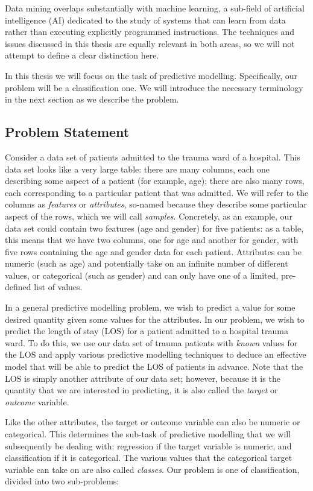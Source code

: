 Data mining overlaps substantially with machine learning, a sub-field of
artificial intelligence (AI) dedicated to the study of systems that can learn
from data rather than executing explicitly programmed instructions. The
techniques and issues discussed in this thesis are equally relevant in both
areas, so we will not attempt to define a clear distinction here.

In this thesis we will focus on the task of predictive modelling. Specifically,
our problem will be a classification one. We will introduce the necessary
terminology in the next section as we describe the problem.

\subsection{Problem Statement}
Consider a data set of patients admitted to the trauma ward of a hospital.
This data set looks like a very large table: there are many columns, each one
describing some aspect of a patient (for example, age); there are also many
rows, each corresponding to a particular patient that was admitted. We will
refer to the columns as \textit{features} or \textit{attributes}, so-named
because they describe some particular aspect of the rows, which we will call
\textit{samples}. Concretely, as an example, our data set could contain
two features (age and gender) for five patients: as a table, this means that
we have two columns, one for age and another for gender, with five rows
containing the age and gender data for each patient. Attributes can be numeric
(such as age) and potentially take on an infinite number of different values,
or categorical (such as gender) and can only have one of a limited, pre-defined
list of values.

In a general predictive modelling problem, we wish to predict a value for some
desired quantity given some values for the attributes. In our problem, we wish
to predict the length of stay (LOS) for a patient admitted to a hospital trauma
ward. To do this, we use our data set of trauma patients with \textit{known}
values for the LOS and apply various predictive modelling techniques to deduce
an effective model that will be able to predict the LOS of patients in advance.
Note that the LOS is simply another attribute of our data set; however, because
it is the quantity that we are interested in predicting, it is also called the
\textit{target} or \textit{outcome} variable.

Like the other attributes, the target or outcome variable can also be numeric
or categorical. This determines the sub-task of predictive modelling that we
will subsequently be dealing with: regression if the target variable is
numeric, and classification if it is categorical. The various values that the
categorical target variable can take on are also called \textit{classes}.
Our problem is one of classification, divided into two sub-problems:


